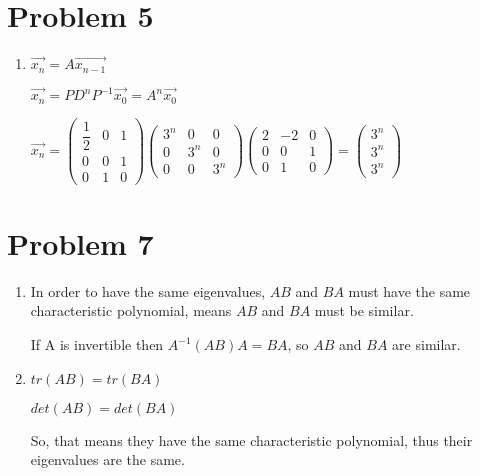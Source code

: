 \documentclass[12pt,letterpaper]{article}
\begin{document}
\section*{Problem 5}
\begin{enumerate}[label=(\alph*)]
    \item
    $\vec{x_n} = A\vec{x_{n-1}}$
    
    $\vec{x_n} = PD^{n}P^{-1}\vec{x_0} = A^n\vec{x_0}$
    
    $\vec{x_n} = \begin{pmatrix}
            \dfrac{1}{2} & 0 & 1 \\
            0 & 0 & 1 \\
            0 & 1 & 0
        \end{pmatrix}\begin{pmatrix}
            3^n & 0 & 0 \\
            0 & 3^n & 0 \\
            0 & 0 & 3^n
        \end{pmatrix}\begin{pmatrix}
            2 & -2 & 0 \\
            0 & 0 & 1 \\
            0 & 1 & 0
        \end{pmatrix} = \begin{pmatrix}
            3^n\\
            3^n\\
            3^n
        \end{pmatrix}$
\end{enumerate}

\section*{Problem 7}
\begin{enumerate}[label=(\alph*)]
    \item 
    In order to have the same eigenvalues, $AB$ and $BA$ must have the same characteristic polynomial, means $AB$ and $BA$ must be similar.
    
    If A is invertible then $A^{-1}(AB)A = BA$, so $AB$ and $BA$ are similar.
    \item
    $tr(AB) = tr(BA)$
    
    $det(AB) = det(BA)$
    
    So, that means they have the same characteristic polynomial, thus their eigenvalues are the same.
\end{enumerate}
\end{document}
